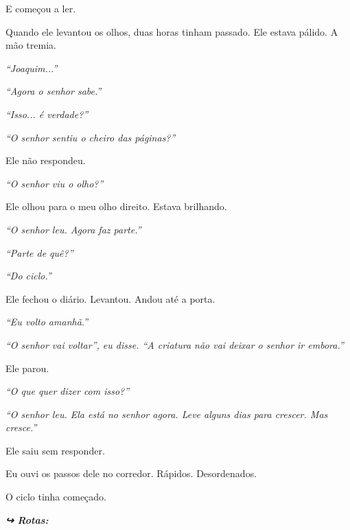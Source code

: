 \noindent E começou a ler.

\noindent Quando ele levantou os olhos, duas horas tinham passado. Ele estava pálido. A mão tremia.

\noindent \textit{\textquotedblleft{}Joaquim...\textquotedblright{}}

\noindent \textit{\textquotedblleft{}Agora o senhor sabe.\textquotedblright{}}

\noindent \textit{\textquotedblleft{}Isso... é verdade?\textquotedblright{}}

\noindent \textit{\textquotedblleft{}O senhor sentiu o cheiro das páginas?\textquotedblright{}}

\noindent Ele não respondeu.

\noindent \textit{\textquotedblleft{}O senhor viu o olho?\textquotedblright{}}

\noindent Ele olhou para o meu olho direito. Estava brilhando.

\noindent \textit{\textquotedblleft{}O senhor leu. Agora faz parte.\textquotedblright{}}

\noindent \textit{\textquotedblleft{}Parte de quê?\textquotedblright{}}

\noindent \textit{\textquotedblleft{}Do ciclo.\textquotedblright{}}

\noindent Ele fechou o diário. Levantou. Andou até a porta.

\noindent \textit{\textquotedblleft{}Eu volto amanhã.\textquotedblright{}}

\noindent \textit{\textquotedblleft{}O senhor vai voltar\textquotedblright{}\textit{, eu disse. }\textquotedblleft{}A criatura não vai deixar o senhor ir embora.\textquotedblright{}}

\noindent Ele parou.

\noindent \textit{\textquotedblleft{}O que quer dizer com isso?\textquotedblright{}}

\noindent \textit{\textquotedblleft{}O senhor leu. Ela está no senhor agora. Leve alguns dias para crescer. Mas cresce.\textquotedblright{}}

\noindent Ele saiu sem responder.

\noindent Eu ouvi os passos dele no corredor. Rápidos. Desordenados.

\noindent O ciclo tinha começado.

\vspace{0.5em}
\noindent\textit{\textbf{↪ Rotas:}  \rotasep {} \rotasep {}}